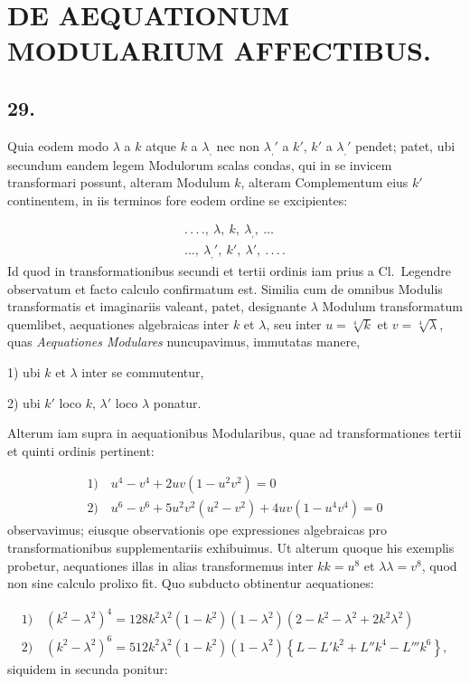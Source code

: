 \documentclass{article}
\begin{document}
\section*{DE AEQUATIONUM MODULARIUM AFFECTIBUS.}

\subsection*{29.}

Quia eodem modo $\lambda$ a $k$ atque $k$ a $\lambda_{,}$ nec non $\lambda_{,}'$ a $k'$, $k'$ a $\lambda_{,}'$ pendet; patet, ubi secundum eandem legem Modulorum scalas condas, qui in se invicem transformari possunt, alteram Modulum $k$, alteram Complementum eius $k'$ continentem, in iis terminos fore eodem ordine se excipientes:

\[
\begin{gathered}
.\,.\,.\,.,\ \lambda,\ k,\ \lambda_{,},\ \ldots\\
\ldots,\ \lambda_{,}',\ k',\ \lambda',\ .\,.\,.\,.
\end{gathered}
\]
Id quod in transformationibus secundi et tertii ordinis iam prius a Cl.\ Legendre observatum et facto calculo confirmatum est. Similia cum de omnibus Modulis transformatis et imaginariis valeant, patet, designante $\lambda$ Modulum transformatum quemlibet, aequationes algebraicas inter $k$ et $\lambda$, seu inter $u=\sqrt[4]{k}$ et $v=\sqrt[4]{\lambda}$, quas \emph{Aequationes Modulares} nuncupavimus, immutatas manere,

1) ubi $k$ et $\lambda$ inter se commutentur,

2) ubi $k'$ loco $k$, $\lambda'$ loco $\lambda$ ponatur.

Alterum iam supra in aequationibus Modularibus, quae ad transformationes tertii et quinti ordinis pertinent:

\[
\begin{gathered}
\text{1)}\quad u^{4}-v^{4}+2uv(1-u^{2}v^{2})=0\\
\text{2)}\quad u^{6}-v^{6}+5u^{2}v^{2}(u^{2}-v^{2})+4uv(1-u^{4}v^{4})=0
\end{gathered}
\]
observavimus; eiusque observationis ope expressiones algebraicas pro transformationibus supplementariis exhibuimus. Ut alterum quoque his exemplis probetur, aequationes illas in alias transformemus inter $kk=u^{8}$ et $\lambda\lambda=v^{8}$, quod non sine calculo prolixo fit. Quo subducto obtinentur aequationes:

\[
\begin{gathered}
\text{1)}\quad(k^{2}-\lambda^{2})^{4}=128k^{2}\lambda^{2}(1-k^{2})(1-\lambda^{2})(2-k^{2}-\lambda^{2}+2k^{2}\lambda^{2})\\
\text{2)}\quad(k^{2}-\lambda^{2})^{6}=512k^{2}\lambda^{2}(1-k^{2})(1-\lambda^{2})\left\{L-L'k^{2}+L''k^{4}-L'''k^{6}\right\},
\end{gathered}
\]
siquidem in secunda ponitur:
\end{document}

